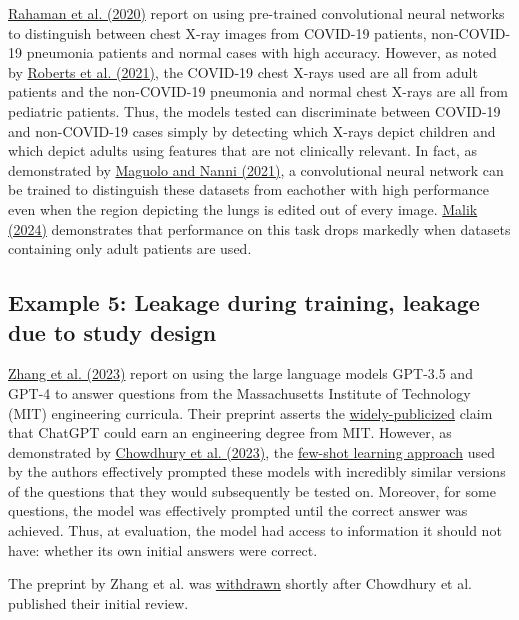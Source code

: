 \documentclass[letterpaper, 12pt]{article}
\begin{document}
\href{https://doi.org/10.3233/XST-200715}{Rahaman et al. (2020)} report on using pre-trained convolutional neural networks to distinguish between chest X-ray images from COVID-19 patients, non-COVID-19 pneumonia patients and normal cases with high accuracy. However, as noted by \href{https://doi.org/10.1038/s42256-021-00307-0}{Roberts et al. (2021)}, the COVID-19 chest X-rays used are all from adult patients and the non-COVID-19 pneumonia and normal chest X-rays are all from pediatric patients. Thus, the models tested can discriminate between COVID-19 and non-COVID-19 cases simply by detecting which X-rays depict children and which depict adults using features that are not clinically relevant. In fact, as demonstrated by \href{https://doi.org/10.1016/j.inffus.2021.04.008}{Maguolo and Nanni (2021)}, a convolutional neural network can be trained to distinguish these datasets from eachother with high performance even when the region depicting the lungs is edited out of every image. \href{https://ucsc-ospo.github.io/report/osre24/nyu/data-leakage/20240924-shaivimalik/}{Malik (2024)} demonstrates that performance on this task drops markedly when datasets containing only adult patients are used.

\subsection*{Example 5: Leakage during training, leakage due to study design}

\href{https://arxiv.org/abs/2306.08997v1}{Zhang et al. (2023)} report on using the large language models GPT-3.5 and GPT-4 to answer questions from the Massachusetts Institute of Technology (MIT) engineering curricula. Their preprint asserts the \href{https://www.chronicle.com/newsletter/weekly-briefing/2023-07-15}{widely-publicized} claim that ChatGPT could earn an engineering degree from MIT. However, as demonstrated by \href{https://flower-nutria-41d.notion.site/No-GPT4-can-t-ace-MIT-b27e6796ab5a48368127a98216c76864}{Chowdhury et al. (2023)}, the \href{https://en.wikipedia.org/wiki/Few-shot_learning}{few-shot learning approach} used by the authors effectively prompted these models with incredibly similar versions of the questions that they would subsequently be tested on. Moreover, for some questions, the model was effectively prompted until the correct answer was achieved. Thus, at evaluation, the model had access to information it should not have: whether its own initial answers were correct.

The preprint by Zhang et al. was \href{https://doi.org/10.48550/arXiv.2306.08997}{withdrawn} shortly after Chowdhury et al. published their initial review.
\end{document}
